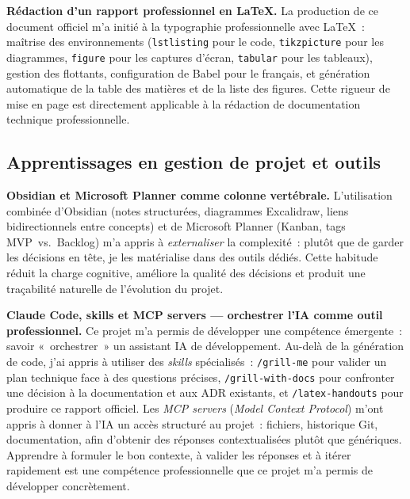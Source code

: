 \documentclass[12pt,a4paper]{article}
\begin{document}
\textbf{Rédaction d'un rapport professionnel en \LaTeX{}.}
La production de ce document officiel m'a initié à la typographie
professionnelle avec \LaTeX{}~: maîtrise des environnements
(\texttt{lstlisting} pour le code, \texttt{tikzpicture} pour les
diagrammes, \texttt{figure} pour les captures d'écran, \texttt{tabular}
pour les tableaux), gestion des flottants, configuration de Babel pour
le français, et génération automatique de la table des matières et de la
liste des figures. Cette rigueur de mise en page est directement applicable
à la rédaction de documentation technique professionnelle.

\subsection{Apprentissages en gestion de projet et outils}

\textbf{Obsidian et Microsoft Planner comme colonne vertébrale.}
L'utilisation combinée d'Obsidian (notes structurées, diagrammes
Excalidraw, liens bidirectionnels entre concepts) et de Microsoft Planner
(Kanban, tags MVP~vs.~Backlog) m'a appris à \textit{externaliser} la
complexité~: plutôt que de garder les décisions en tête, je les
matérialise dans des outils dédiés. Cette habitude réduit la charge
cognitive, améliore la qualité des décisions et produit une traçabilité
naturelle de l'évolution du projet.

\textbf{Claude Code, skills et MCP servers --- orchestrer l'IA comme outil
professionnel.}
Ce projet m'a permis de développer une compétence émergente~: savoir
«~orchestrer~» un assistant IA de développement. Au-delà de la génération
de code, j'ai appris à utiliser des \textit{skills} spécialisés~:
\texttt{/grill-me} pour valider un plan technique face à des questions
précises, \texttt{/grill-with-docs} pour confronter une décision à la
documentation et aux ADR existants, et \texttt{/latex-handouts} pour
produire ce rapport officiel. Les \textit{MCP servers}
(\textit{Model Context Protocol}) m'ont appris à donner à l'IA un accès
structuré au projet~: fichiers, historique Git, documentation, afin d'obtenir
des réponses contextualisées plutôt que génériques. Apprendre à formuler
le bon contexte, à valider les réponses et à itérer rapidement est une
compétence professionnelle que ce projet m'a permis de développer
concrètement.

\end{document}
